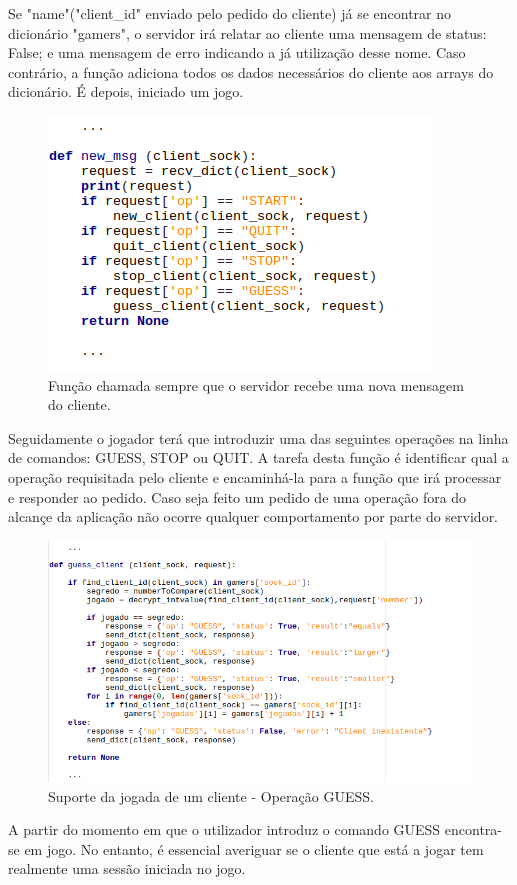 \documentclass{report}
\begin{document}
Se "name"("client\_id" enviado pelo pedido do cliente) já se encontrar no dicionário "gamers", o servidor irá relatar ao cliente uma mensagem de status: False; e uma mensagem de erro indicando a já utilização desse nome.
Caso contrário, a função adiciona todos os dados necessários do cliente aos arrays do dicionário. É depois, iniciado um jogo.

\begin{figure}[H]
        \centering
        \includegraphics[scale=0.65]{new_msg}   
        \caption{Função chamada sempre que o servidor recebe uma nova mensagem do cliente.}
\end{figure}
Seguidamente o jogador terá que introduzir uma das seguintes operações na linha de comandos: GUESS, STOP ou QUIT.
A tarefa desta função é identificar qual a operação requisitada pelo cliente e encaminhá-la para a função que irá processar e responder ao pedido.
Caso seja feito um pedido de uma operação fora do alcançe da aplicação não ocorre qualquer comportamento por parte do servidor.

\begin{figure}[H]
        \centering
        \includegraphics[scale=0.65]{guess_client}      
        \caption{Suporte da jogada de um cliente - Operação GUESS.}
\end{figure}
A partir do momento em que o utilizador introduz o comando GUESS encontra-se em jogo. No entanto, é essencial averiguar se o cliente que está a jogar tem realmente uma sessão iniciada no jogo.
\end{document}
